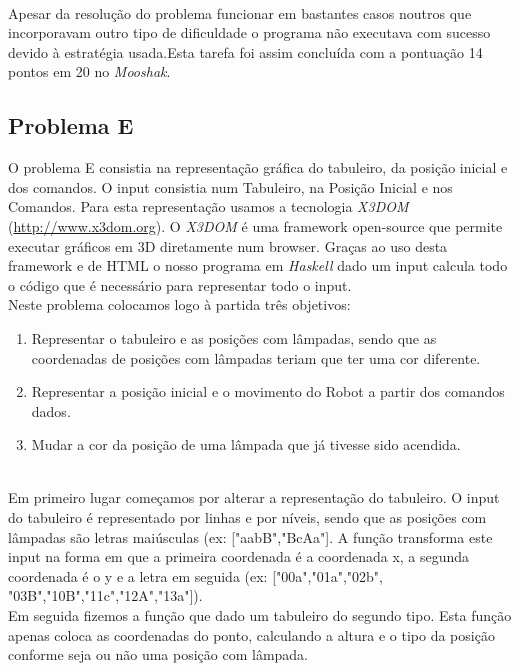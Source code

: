 \documentclass[a4paper,12pt,portuges]{article}
\begin{document}
\\

Apesar da resolução do problema funcionar em bastantes casos noutros que incorporavam outro tipo de dificuldade o programa não executava com sucesso devido à estratégia usada.Esta tarefa foi assim concluída com a pontuação 14 pontos em 20 no \textit{Mooshak}.\\

\subsection {Problema E}

O problema E consistia na representação gráfica do tabuleiro, da posição inicial e dos comandos. O input consistia num Tabuleiro, na Posição Inicial e nos Comandos. Para esta representação usamos a tecnologia \textit{X3DOM} (\underline{http://www.x3dom.org}). O \textit{X3DOM} é uma framework open-source que permite executar gráficos em 3D diretamente num browser. Graças ao uso desta framework e de HTML o nosso programa em \textit{Haskell} dado um input calcula todo o código que é necessário para representar todo o input.\\
Neste problema colocamos logo à partida três objetivos:\\
\begin{enumerate}
\item Representar o tabuleiro e as posições com lâmpadas, sendo que as coordenadas de posições com lâmpadas teriam que ter uma cor diferente. \\
\item Representar a posição inicial e o movimento do Robot a partir dos comandos dados.\\
\item Mudar a cor da posição de uma lâmpada que já tivesse sido acendida.
\end{enumerate}
\\

Em primeiro lugar começamos por alterar a representação do tabuleiro. O input do tabuleiro é representado por linhas e por níveis, sendo que as posições com lâmpadas são letras maiúsculas (ex: ["aabB","BcAa"]. A função transforma este input na forma em que a primeira coordenada é a coordenada x, a segunda coordenada é o y e a letra em seguida (ex: ["00a","01a","02b",\\"03B","10B","11c","12A","13a"]).
\\
Em seguida fizemos a função que dado um tabuleiro do segundo tipo. Esta função apenas coloca as coordenadas do ponto, calculando a altura e o tipo da posição conforme seja ou não  uma posição com lâmpada.\\
\end{document}
